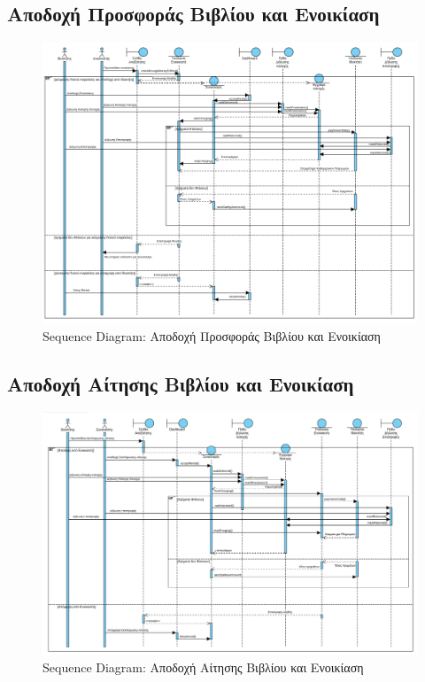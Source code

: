 \documentclass[12pt,a4paper]{article}
\begin{document}
\subsection{Αποδοχή Προσφοράς Βιβλίου και Ενοικίαση}
\begin{figure}[H]
	\includegraphics[width=\textwidth]{Accept Book Offer and Rent Sequence.png}
	\caption{Sequence Diagram: Αποδοχή Προσφοράς Βιβλίου και Ενοικίαση}
	\label{Sequence Diagram: Αποδοχή Προσφοράς Βιβλίου και Ενοικίαση}
\end{figure}

\subsection{Αποδοχή Αίτησης Βιβλίου και Ενοικίαση}
\begin{figure}[H]
	\includegraphics[width=\textwidth]{Accept Request Offer and Rent Sequence.png}
	\caption{Sequence Diagram: Αποδοχή Αίτησης Βιβλίου και Ενοικίαση}
	\label{Sequence Diagram: Αποδοχή Αίτησης Βιβλίου και Ενοικίαση}
\end{figure}
\end{document}

